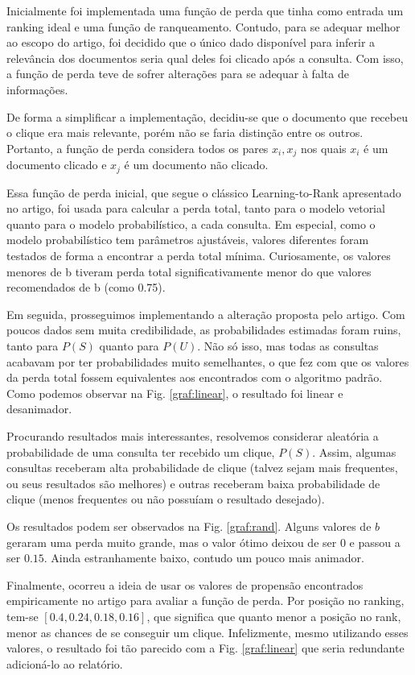\documentclass{svproc}
\begin{document}
Inicialmente foi implementada uma função de perda que tinha como entrada um ranking ideal e uma função de ranqueamento.
Contudo, para se adequar melhor ao escopo do artigo, foi decidido que o único dado disponível para inferir a relevância dos
documentos seria qual deles foi clicado após a consulta. Com isso, a função de perda teve de sofrer alterações para se 
adequar à falta de informações.

De forma a simplificar a implementação, decidiu-se que o documento que recebeu o clique era mais relevante, porém não se 
faria distinção entre os outros. Portanto, a função de perda considera todos os pares $x_i, x_j$ nos quais $x_i$ é um 
documento clicado e $x_j$ é um documento não clicado.

Essa função de perda inicial, que segue o clássico Learning-to-Rank apresentado no artigo, foi usada para 
calcular a perda total, tanto para o modelo vetorial quanto para o modelo probabilístico, a cada consulta. 
Em especial, como o modelo probabilístico tem parâmetros ajustáveis, valores diferentes foram testados de forma
a encontrar a perda total mínima. Curiosamente, os valores menores de b tiveram perda total significativamente menor do que
valores recomendados de b (como 0.75).

Em seguida, prosseguimos implementando a alteração proposta pelo artigo. Com poucos dados sem muita credibilidade, as
probabilidades estimadas foram ruins, tanto para $P(S)$ quanto para $P(U)$. Não só isso, mas todas as consultas acabavam
por ter probabilidades muito semelhantes, o que fez com que os valores da perda total fossem equivalentes aos encontrados
com o algoritmo padrão. Como podemos observar na Fig. \ref{graf:linear}, o resultado foi linear e desanimador.

Procurando resultados mais interessantes, resolvemos considerar aleatória a probabilidade de uma consulta ter recebido um
clique, $P(S)$. Assim, algumas consultas receberam alta probabilidade de clique (talvez sejam mais frequentes, ou seus 
resultados são melhores) e outras receberam baixa probabilidade de clique (menos frequentes ou não possuíam o resultado 
desejado).

Os resultados podem ser observados na Fig. \ref{graf:rand}. Alguns valores de $b$ geraram uma perda muito grande, mas o 
valor ótimo deixou de ser $0$ e passou a ser $0.15$. Ainda estranhamente baixo, contudo um pouco mais animador.

Finalmente, ocorreu a ideia de usar os valores de propensão encontrados empiricamente no artigo para avaliar a função
de perda. Por posição no ranking, tem-se $[0.4, 0.24, 0.18, 0.16]$, que significa que quanto menor a posição no rank,
menor as chances de se conseguir um clique. Infelizmente, mesmo utilizando esses valores, o resultado foi tão parecido com 
a Fig. \ref{graf:linear} que seria redundante adicioná-lo ao relatório.
\end{document}
